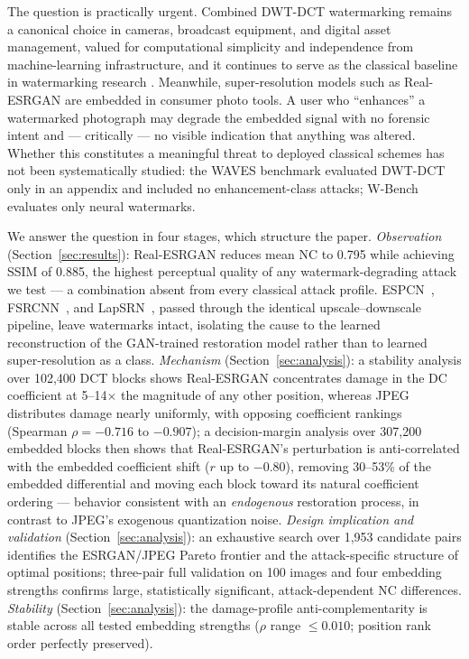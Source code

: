 \documentclass[conference]{IEEEtran}
\begin{document}
The question is practically urgent. Combined DWT-DCT watermarking
\cite{alhaj2007} remains a canonical choice in cameras, broadcast
equipment, and digital asset management, valued for computational
simplicity and independence from machine-learning infrastructure, and it
continues to serve as the classical baseline in watermarking research
\cite{waves2024}. Meanwhile, super-resolution models such as Real-ESRGAN
\cite{realesrgan2021} are embedded in consumer photo tools. A user who
``enhances'' a watermarked photograph may degrade the embedded signal
with no forensic intent and --- critically --- no visible indication that
anything was altered. Whether this constitutes a meaningful threat to
deployed classical schemes has not been systematically studied: the WAVES
benchmark \cite{waves2024} evaluated DWT-DCT only in an appendix and
included no enhancement-class attacks; W-Bench \cite{wbench2024}
evaluates only neural watermarks.

We answer the question in four stages, which structure the paper.
\emph{Observation} (Section~\ref{sec:results}): Real-ESRGAN reduces
mean NC to 0.795 while achieving SSIM of 0.885, the highest perceptual
quality of any watermark-degrading attack we test --- a combination
absent from every classical attack profile. ESPCN~\cite{espcn2016},
FSRCNN~\cite{fsrcnn2016}, and LapSRN~\cite{lapsrn2017}, passed through
the identical upscale--downscale pipeline, leave watermarks intact,
isolating the cause to the learned reconstruction of the GAN-trained
restoration model rather than to learned super-resolution as a class.
\emph{Mechanism} (Section~\ref{sec:analysis}): a stability analysis over
102,400 DCT blocks shows Real-ESRGAN concentrates damage in the DC
coefficient at 5--14$\times$ the magnitude of any other position, whereas
JPEG distributes damage nearly uniformly, with opposing coefficient
rankings (Spearman $\rho = -0.716$ to $-0.907$); a decision-margin
analysis over 307,200 embedded blocks then shows that Real-ESRGAN's
perturbation is anti-correlated with the embedded coefficient shift
($r$ up to $-0.80$), removing 30--53\% of the embedded differential and
moving each block toward its natural coefficient ordering --- behavior
consistent with an \emph{endogenous} restoration process, in contrast
to JPEG's exogenous quantization noise.
\emph{Design implication and validation}
(Section~\ref{sec:analysis}): an exhaustive search over 1,953 candidate
pairs identifies the ESRGAN/JPEG Pareto frontier and the attack-specific
structure of optimal positions; three-pair full validation on 100 images
and four embedding strengths confirms large, statistically significant,
attack-dependent NC differences.
\emph{Stability} (Section~\ref{sec:analysis}): the damage-profile
anti-complementarity is stable across all tested embedding strengths
($\rho$ range $\leq 0.010$; position rank order perfectly preserved).
\end{document}
